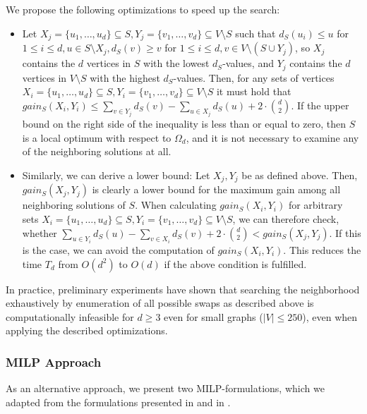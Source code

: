 \documentclass[draft,final]{vutinfth} %
\begin{document}
We propose the following optimizations to speed up the search: 
\begin{itemize}
    \item Let $X_j = \{u_1, \dots, u_d\} \subseteq S, Y_j = \{v_1, \dots, v_d\} \subseteq V \setminus S$ such that $d_S(u_i) \leq u$ for $1 \leq i \leq d, u \in S \setminus X_j, d_S(v) \geq v$ for $1 \leq i \leq d, v \in V \setminus (S \cup Y_j)$, so $X_j$ contains the $d$ vertices in $S$ with the lowest $d_S$-values, and $Y_j$ contains the $d$ vertices in $V\setminus S$ with the highest $d_S$-values.  
    Then, for any sets of vertices $X_i = \{u_1, \dots, u_d\} \subseteq S, Y_i = \{v_1, \dots, v_d\} \subseteq V \setminus S$ it must hold that $\mathit{gain_S}(X_i, Y_i) \leq \sum_{v \in Y_j} d_S(v) - \sum_{u \in X_j} d_S(u) + 2 \cdot \binom{d}{2}$. If the upper bound on the right side of the inequality is less than or equal to zero, then $S$ is a local optimum with respect to $\Omega_d$, and it is not necessary to examine any of the neighboring solutions at all. 
    \item Similarly, we can derive a lower bound: Let $X_j, Y_j$ be as defined above. Then, $\mathit{gain_S}(X_j, Y_j)$ is clearly a lower bound for the maximum gain among all neighboring solutions of $S$. When calculating $\mathit{gain_S}(X_i, Y_i)$ for arbitrary sets $X_i = \{u_1, \dots, u_d\} \subseteq S, Y_i = \{v_1, \dots, v_d\} \subseteq V \setminus S$, we can therefore check, whether $\sum_{u \in Y_i} d_S(u) - \sum_{v \in X_i} d_S(v) + 2 \cdot \binom{d}{2} < \mathit{gain_S}(X_j, Y_j)$. If this is the case, we can avoid the computation of $\mathit{gain_S}(X_i, Y_i)$. This reduces the time $T_d$ from $O(d^2)$ to $O(d)$ if the above condition is fulfilled. 
\end{itemize}

In practice, preliminary experiments have shown that searching the neighborhood exhaustively by enumeration of all possible swaps as described above is computationally infeasible for $d \geq 3$ even for small graphs ($|V| \leq 250$), even when applying the described optimizations. 

\subsubsection{MILP Approach}

As an alternative approach, we present two MILP-formulations, which we adapted from the formulations presented in \cite{pattillo_maximum_2013} and in \cite{VeremyevPBP16}.
 
\end{document}

